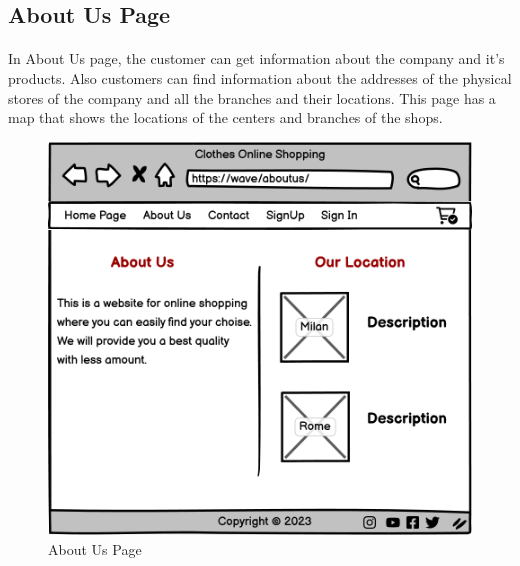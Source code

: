 \subsection{About Us Page}
\bigskip
\paragraph{}
In About Us page, the customer can get information about the company and it's products. Also customers can find information about the addresses of the physical stores of the company and all the branches and their locations. This page has a map that shows the locations of the centers and branches of the shops.
\bigskip
\bigskip
\bigskip
\begin{figure}[h]
\centerline{\includegraphics[scale=1.]{images/About Us.png}}
\caption{About Us Page}
\label{fig}
\end{figure}